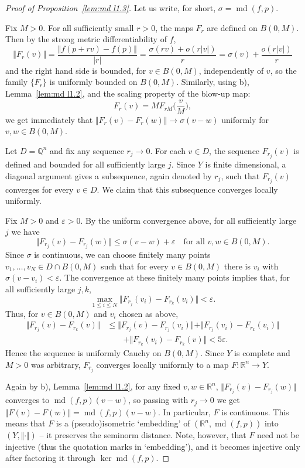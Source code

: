 \documentclass[12pt,leqno]{amsart}
\theoremstyle{definition}
\newcommand{\bbbr}{\mathbb R}
\newcommand{\eps}{\varepsilon}
\def\md{\operatorname{md}}
\numberwithin{theorem}{section} \numberwithin{equation}{section}
\begin{document}
\begin{proof}[Proof of Proposition~\ref{lem:md l1.3}]
Let us write, for short, $\sigma=\md(f,p)$.

Fix $M>0$. For all sufficiently small $r>0$, the maps $F_r$ are defined on $B(0,M)$. Then by the strong metric differentiability of $f$,
$$
\Vert F_r(v)\Vert=\frac{\Vert f(p+rv)-f(p)\Vert}{|r|}=\frac{\sigma(rv)+o(r|v|)}{r}=\sigma(v)+\frac{o(r|v|)}{r}
$$
and the right hand side is bounded, for $v\in B(0,M)$, independently of $v$, so the family $\{F_r\}$ is uniformly bounded on $B(0,M)$. Similarly, using
b), Lemma~\ref{lem:md l1.2}, and the scaling property of the blow-up map:
$$
F_r(v)=MF_{rM}\Big(\frac{v}{M}\Big),
$$
we get immediately that $\Vert F_r(v)-F_r(w)\Vert\to \sigma(v-w)$ uniformly for $v,w\in B(0,M)$.

Let $D=\mathbb Q^n$ and fix any sequence $r_j\to 0$. For each $v\in D$, the sequence $F_{r_j}(v)$ is defined and bounded for all sufficiently large $j$. Since $Y$ is finite dimensional, a diagonal argument gives a subsequence, again denoted by $r_j$, such that $F_{r_j}(v)$ converges for every $v\in D$. We claim that this subsequence converges locally uniformly.

Fix $M>0$ and $\eps>0$. By the uniform convergence above, for all sufficiently large $j$ we have
$$
\Vert F_{r_j}(v)-F_{r_j}(w)\Vert\leq\sigma(v-w)+\eps
\quad\text{for all $v,w\in B(0,M)$.}
$$
Since $\sigma$ is continuous, we can choose finitely many points $v_1,\ldots,v_N\in D\cap B(0,M)$ such that for every $v\in B(0,M)$ there is $v_i$ with $\sigma(v-v_i)<\eps$. The convergence at these finitely many points implies that, for all sufficiently large $j,k$,
$$
\max_{1\leq i\leq N}\Vert F_{r_j}(v_i)-F_{r_k}(v_i)\Vert<\eps.
$$
Thus, for $v\in B(0,M)$ and $v_i$ chosen as above,
\begin{equation*}
\begin{split}
\Vert F_{r_j}(v)-F_{r_k}(v)\Vert
&\leq\Vert F_{r_j}(v)-F_{r_j}(v_i)\Vert
+\Vert F_{r_j}(v_i)-F_{r_k}(v_i)\Vert\\
&\qquad+\Vert F_{r_k}(v_i)-F_{r_k}(v)\Vert
<5\eps.
\end{split}
\end{equation*}
Hence the sequence is uniformly Cauchy on $B(0,M)$. Since $Y$ is complete and $M>0$ was arbitrary, $F_{r_j}$ converges locally uniformly to a map $F:\bbbr^n\to Y$.

Again by b), Lemma~\ref{lem:md l1.2}, for any fixed $v,w\in\bbbr^n$,
$\Vert F_{r_j}(v)-F_{r_j}(w)\Vert$ converges to $\md(f,p)(v-w)$, so passing with $r_j\to 0$ we get
$\Vert F(v)-F(w)\Vert=\md(f,p)(v-w)$. In particular, $F$ is continuous. This means that $F$ is a (pseudo)isometric `embedding' of $(\bbbr^n,\md(f,p))$ into $(Y,\Vert\cdot\Vert)$ -- it preserves the seminorm distance. Note, however, that $F$ need not be injective (thus the quotation marks in `embedding'), and it becomes injective only after factoring it through $\ker \md(f,p)$.


\end{proof}
\end{document}
